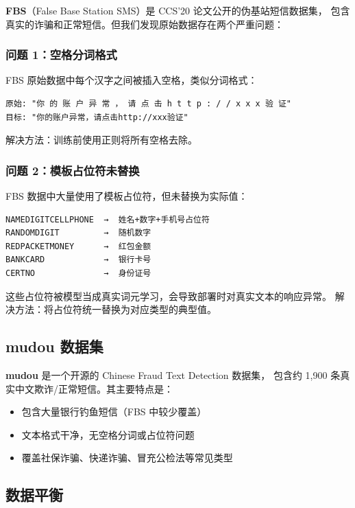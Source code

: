 \documentclass[11pt,a4paper]{article}
\begin{document}
\textbf{FBS}（False Base Station SMS）是 CCS'20 论文公开的伪基站短信数据集，
包含真实的诈骗和正常短信。但我们发现原始数据存在两个严重问题：

\subsubsection{问题 1：空格分词格式}

FBS 原始数据中每个汉字之间被插入空格，类似分词格式：

\begin{Verbatim}[frame=single,fontsize=\small]
原始: "你 的 账 户 异 常 ， 请 点 击 h t t p : / / x x x 验 证"
目标: "你的账户异常，请点击http://xxx验证"
\end{Verbatim}

解决方法：训练前使用正则将所有空格去除。

\subsubsection{问题 2：模板占位符未替换}

FBS 数据中大量使用了模板占位符，但未替换为实际值：

\begin{Verbatim}[frame=single,fontsize=\small,label=常见占位符]
NAMEDIGITCELLPHONE  →  姓名+数字+手机号占位符
RANDOMDIGIT         →  随机数字
REDPACKETMONEY      →  红包金额
BANKCARD            →  银行卡号
CERTNO              →  身份证号
\end{Verbatim}

这些占位符被模型当成真实词元学习，会导致部署时对真实文本的响应异常。
解决方法：将占位符统一替换为对应类型的典型值。

\subsection{mudou 数据集}

\textbf{mudou} 是一个开源的 Chinese Fraud Text Detection 数据集，
包含约 1,900 条真实中文欺诈/正常短信。其主要特点是：

\begin{itemize}
  \item 包含大量银行钓鱼短信（FBS 中较少覆盖）
  \item 文本格式干净，无空格分词或占位符问题
  \item 覆盖社保诈骗、快递诈骗、冒充公检法等常见类型
\end{itemize}

\subsection{数据平衡}
\end{document}
